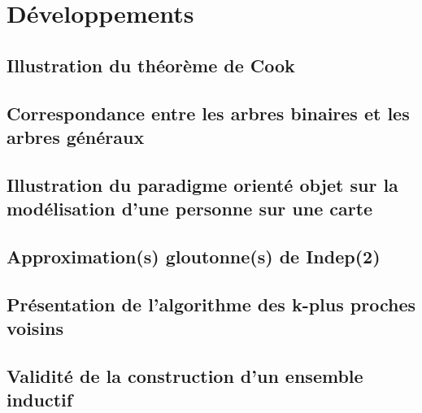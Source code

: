 \makeatletter
\renewcommand{\@chapapp}{Développement}
\setcounter{chapter}{0}
\makeatother
\renewcommand\theHchapter{sec.\thechapter} %

\part{Développements}

\chapter{Illustration du théorème de Cook}\label{D30}


\chapter{Correspondance entre les arbres binaires et les arbres généraux}\label{D31}


\chapter{Illustration du paradigme orienté objet sur la modélisation d'une personne sur une carte}\label{D32}


\chapter{Approximation(s) gloutonne(s) de Indep(2)}\label{D33}


\chapter{Présentation de l'algorithme des k-plus proches voisins}\label{D34}


\chapter{Validité de la construction d'un ensemble inductif}\label{D35}


%


